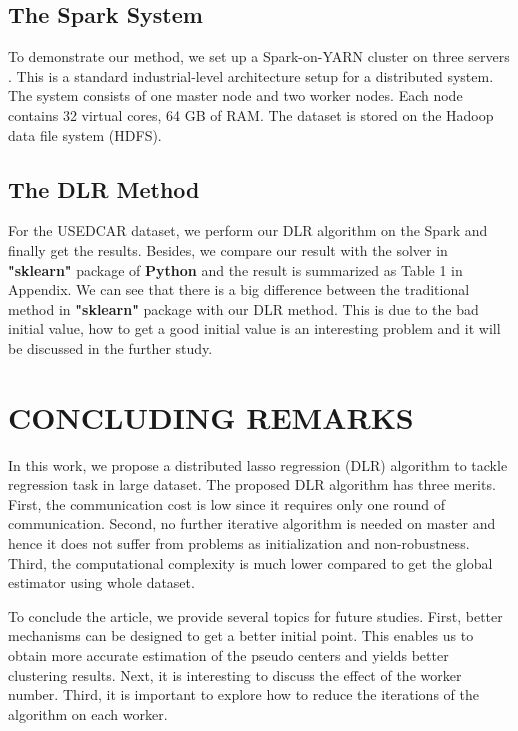 \documentclass[11pt,en,authoryear]{elegantpaper}
\numberwithin{equation}{section}
\begin{document}
\subsection{The Spark System}

To demonstrate our method, we set up a Spark-on-YARN cluster on three servers . This is a standard industrial-level architecture setup for a distributed system. The system consists of one master node and two worker nodes. Each node contains 32 virtual cores, 64 GB of RAM. The dataset is stored on the Hadoop data file system (HDFS).

\subsection{The DLR Method}

For the USEDCAR dataset, we perform our DLR algorithm on the Spark and finally get the results. Besides, we compare our result with the solver in \textbf{"sklearn"} package of \textbf{Python} and the result is summarized as Table 1 in Appendix. We can see that there is a big difference between the traditional method in \textbf{"sklearn"} package with our DLR method. This is due to the bad initial value, how to get a good initial value is an interesting problem and it will be discussed in the further study.

\section{CONCLUDING REMARKS}\label{sec:6}

In this work, we propose a distributed lasso regression (DLR) algorithm to tackle regression task in large dataset. The proposed DLR algorithm has three merits. First, the communication cost is low since it requires only one round of communication. Second, no further iterative algorithm is needed on master and hence it does not suffer from problems as initialization and non-robustness. Third, the computational complexity is much lower compared to get the global estimator using whole dataset. 

To conclude the article, we provide several topics for future studies. First, better mechanisms can be designed to get a better initial point. This enables us to obtain more accurate estimation of the pseudo centers and yields better clustering results. Next, it is interesting to discuss the effect of the worker number. Third, it is important to explore how to reduce the iterations of the algorithm on each worker.
\end{document}
